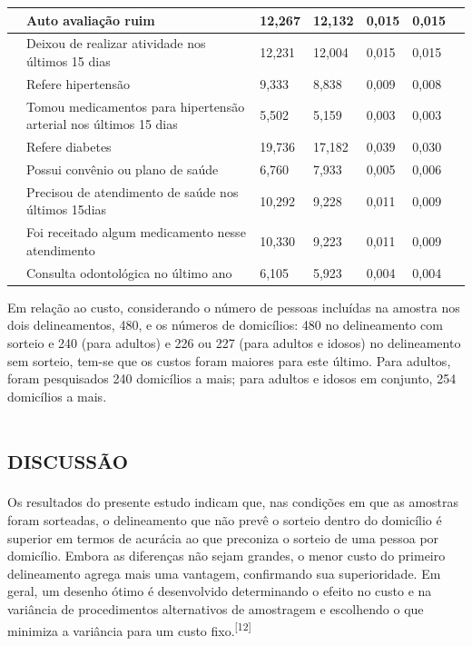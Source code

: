 \documentclass{article}
\begin{document}
\begin{table}
\begin{xtabular}{ l | l | l l | l | l | l }
& Auto avaliação ruim
& 12,267
& 12,132
& 0,015
& 0,015
\\ \hline

& Deixou de realizar atividade nos últimos 15 dias
& 12,231
& 12,004
& 0,015
& 0,015
\\ \hline

& Refere hipertensão
& 9,333
& 8,838
& 0,009
& 0,008
\\ \hline

& Tomou medicamentos para hipertensão arterial nos últimos 15 dias
& 5,502
& 5,159
& 0,003
& 0,003
\\ \hline

& Refere diabetes
& 19,736
& 17,182
& 0,039
& 0,030
\\ \hline

& Possui convênio ou plano de saúde
& 6,760
& 7,933
& 0,005
& 0,006
\\ \hline

& Precisou de atendimento de saúde nos últimos 15dias
& 10,292
& 9,228
& 0,011
& 0,009
\\ \hline

& Foi receitado algum medicamento nesse atendimento
& 10,330
& 9,223
& 0,011
& 0,009
\\ \hline

& Consulta odontológica no último ano
& 6,105
& 5,923
& 0,004
& 0,004
\\ \hline

\end{xtabular}
\end{table}

Em relação ao custo, considerando o número de pessoas incluídas na amostra nos
dois delineamentos, 480, e os números de domicílios: 480 no delineamento com
sorteio e 240 (para adultos) e 226 ou 227 (para adultos e idosos) no
delineamento sem sorteio, tem-se que os custos foram maiores para este último.
Para adultos, foram pesquisados 240 domicílios a mais; para adultos e idosos em
conjunto, 254 domicílios a mais.

\section{\textsc{discussão}}

Os resultados do presente estudo indicam que, nas condições em que as amostras
foram sorteadas, o delineamento que não prevê o sorteio dentro do domicílio é
superior em termos de acurácia ao que preconiza o sorteio de uma pessoa por
domicílio. Embora as diferenças não sejam grandes, o menor custo do primeiro
delineamento agrega mais uma vantagem, confirmando sua superioridade. Em geral,
um desenho ótimo é desenvolvido determinando o efeito no custo e na variância de
procedimentos alternativos de amostragem e escolhendo o que minimiza a variância
para um custo fixo.\textsuperscript{[}\textsuperscript{12}\textsuperscript{]}
\end{document}
